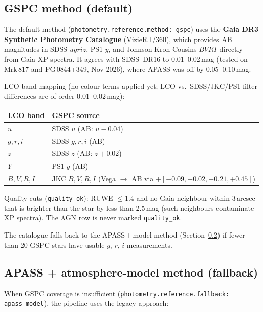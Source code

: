 \documentclass[12pt,a4paper]{article}
\begin{document}
\subsection{GSPC method (default)}

The default method (\texttt{photometry.reference.method: gspc}) uses the
\textbf{Gaia DR3 Synthetic Photometry Catalogue} (VizieR I/360), which provides
AB magnitudes in SDSS $ugriz$, PS1 $y$, and Johnson-Kron-Cousins $BVRI$
directly from Gaia XP spectra.  It agrees with SDSS~DR16 to 0.01--0.02\,mag
(tested on Mrk\,817 and PG\,0844+349, Nov 2026), where APASS was off by
0.05--0.10\,mag.

LCO band mapping (no colour terms applied yet; LCO vs.\ SDSS/JKC/PS1 filter
differences are of order 0.01--0.02\,mag):

\begin{center}
\small
\begin{tabular}{ll}
\toprule
LCO band & GSPC source \\
\midrule
$u$ & SDSS $u$ (AB: $u - 0.04$) \\
$g,r,i$ & SDSS $g,r,i$ (AB) \\
$z$ & SDSS $z$ (AB: $z + 0.02$) \\
$Y$ & PS1 $y$ (AB) \\
$B,V,R,I$ & JKC $B,V,R,I$ (Vega $\to$ AB via $+[-0.09, +0.02, +0.21, +0.45]$) \\
\bottomrule
\end{tabular}
\end{center}

Quality cuts (\texttt{quality\_ok}): RUWE $\leq 1.4$ and no Gaia neighbour
within 3\,arcsec that is brighter than the star by less than 2.5\,mag (such
neighbours contaminate XP spectra).  The AGN row is never marked
\texttt{quality\_ok}.

The catalogue falls back to the APASS\,+\,model method (Section~\ref{sec:apass_model})
if fewer than 20 GSPC stars have usable $g$, $r$, $i$ measurements.

\subsection{APASS + atmosphere-model method (fallback)}
\label{sec:apass_model}

When GSPC coverage is insufficient (\texttt{photometry.reference.fallback:
apass\_model}), the pipeline uses the legacy approach:
\end{document}
